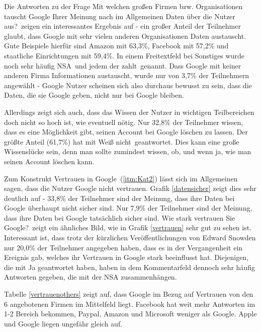 Die Antworten zu der Frage \glqq Mit welchen großen Firmen bzw. Organisationen tauscht Google Ihrer Meinung nach im Allgemeinen Daten über die Nutzer aus?\grqq\ zeigen ein interessantes Ergebnis auf - ein großer Anteil der Teilnehmer glaubt, dass Google mit sehr vielen anderen Organisationen Daten austauscht. Gute Beispiele hierfür sind Amazon mit 63,3\%, Facebook mit 57,2\% und staatliche Einrichtungen mit 59,4\%. In einem Freitextfeld bei Sonstiges wurde noch sehr häufig \glqq NSA\grqq\ und \glqq jedem der zahlt\grqq\ genannt. Dass Google mit keiner anderen Firma Informationen austauscht, wurde nur von 3,7\% der Teilnehmern angewählt - Google Nutzer scheinen sich also durchaus bewusst zu sein, dass die Daten, die sie Google geben, nicht nur bei Google bleiben.

Allerdings zeigt sich auch, dass das Wissen der Nutzer in wichtigen Teilbereichen doch nicht so hoch ist, wie eventuell nötig. Nur 32,8\% der  Teilnehmer wissen, dass es eine Möglichkeit gibt, seinen Account bei Google löschen zu lassen. Der größte Anteil (61,7\%) hat mit \glqq Weiß nicht\grqq\ geantwortet. Dies kann eine große Wissenslücke sein, denn man sollte zumindest wissen, ob, und wenn ja, wie man seinen Account löschen kann.

Zum Konstrukt \glqq Vertrauen in Google\grqq\ (\ref{itm:Kat2}) lässt sich im Allgemeinen sagen, dass die Nutzer Google nicht vertrauen. Grafik \ref{datensicher} zeigt dies sehr deutlich auf - 33,8\% der Teilnehmer sind der Meinung, dass ihre Daten bei Google überhaupt nicht sicher sind. Nur 7,9\% der Teilnehmer sind der Meinung, dass ihre Daten bei Google tatsächlich sicher sind. \glqq Wie stark vertrauen Sie Google?\grqq\ zeigt ein ähnliches Bild, wie in Grafik \ref{vertrauen} sehr gut zu sehen ist. Interessant ist, dass trotz der kürzlichen Veröffentlichungen von Edward Snowden nur 20,0\% der Teilnehmer angegeben haben, dass es in der Vergangenheit ein Ereignis gab, welches ihr Vertrauen in Google stark beeinflusst hat. Diejenigen, die mit Ja geantwortet haben, haben in dem Kommentarfeld dennoch sehr häufig Antworten gegeben, die mit der NSA zusammenhängen.

Tabelle \ref{vertrauenothers} zeigt auf, dass Google im Bezug auf Vertrauen von den 6 angebotenen Firmen im Mittelfeld liegt. Facebook hat weit mehr Antworten im 1-2 Bereich bekommen, Paypal, Amazon und Microsoft weniger als Google. Apple und Google liegen ungefähr gleich auf.

